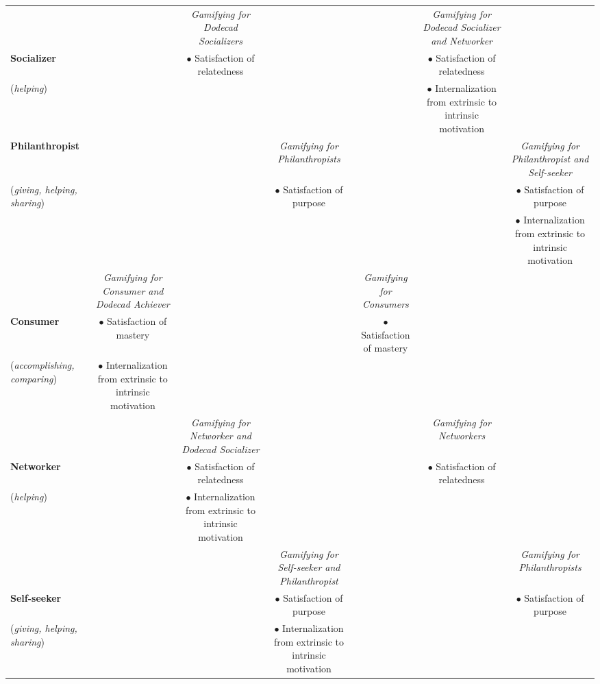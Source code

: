\begin{landscape}
\begin{quadro}[htb]
\begin{tabular}{|l|c|c|c|c|c|c|}
& &
\multicolumn{1}{p{3cm}|}{\tiny\emph{Gamifying for Dodecad Socializers}}& & &
\multicolumn{1}{p{3cm}|}{\tiny\emph{Gamifying for Dodecad Socializer and Networker}}& \tabularnewline
{\textbf{Socializer}}& &
\multicolumn{1}{p{3cm}|}{\tiny{$\bullet$ Satisfaction of relatedness}}& & &
\multicolumn{1}{p{3cm}|}{\tiny{$\bullet$ Satisfaction of relatedness}}& \tabularnewline
{\tiny(\emph{helping})}& & 
\multicolumn{1}{p{3cm}|}{}& & &
\multicolumn{1}{p{3cm}|}{\tiny{$\bullet$ Internalization from extrinsic to intrinsic motivation}}& \tabularnewline
\hline

\textbf{Philanthropist}& & &
\multicolumn{1}{p{3cm}|}{\tiny\emph{Gamifying for Philanthropists}}& & &
\multicolumn{1}{p{3cm}|}{\tiny\emph{Gamifying for Philanthropist and Self-seeker}}\tabularnewline
{\tiny(\emph{giving, helping, sharing})}& & &
\multicolumn{1}{p{3cm}|}{\tiny{$\bullet$ Satisfaction of purpose}}& & &
\multicolumn{1}{p{3cm}|}{\tiny{$\bullet$ Satisfaction of purpose}}\tabularnewline
& & &
\multicolumn{1}{p{3cm}|}{}& & &
\multicolumn{1}{p{3cm}|}{\tiny{$\bullet$ Internalization from extrinsic to intrinsic motivation}}\tabularnewline
\hline

&
\multicolumn{1}{p{3cm}|}{\tiny\emph{Gamifying for Consumer and Dodecad Achiever}}& & &
\multicolumn{1}{p{3cm}|}{\tiny\emph{Gamifying for Consumers}}& &  \tabularnewline
{\textbf{Consumer}}&
\multicolumn{1}{p{3cm}|}{\tiny{$\bullet$ Satisfaction of mastery}}& & &
\multicolumn{1}{p{3cm}|}{\tiny{$\bullet$ Satisfaction of mastery}}& & \tabularnewline
{\tiny(\emph{accomplishing, comparing})}&
\multicolumn{1}{p{3cm}|}{\tiny{$\bullet$ Internalization from extrinsic to intrinsic motivation}}& & &
\multicolumn{1}{p{3cm}|}{}& & \tabularnewline%
\hline

& &
\multicolumn{1}{p{3cm}|}{\tiny\emph{Gamifying for Networker and Dodecad Socializer}}& & &
\multicolumn{1}{p{3cm}|}{\tiny\emph{Gamifying for Networkers}}&  \tabularnewline
{\textbf{Networker}}& &
\multicolumn{1}{p{3cm}|}{\tiny{$\bullet$ Satisfaction of relatedness}}& & &
\multicolumn{1}{p{3cm}|}{\tiny{$\bullet$ Satisfaction of relatedness}}& \tabularnewline
{\tiny(\emph{helping})}& & 
\multicolumn{1}{p{3cm}|}{\tiny{$\bullet$ Internalization from extrinsic to intrinsic motivation}}& & &
\multicolumn{1}{p{3cm}|}{}& \tabularnewline
\hline

& & &
\multicolumn{1}{p{3cm}|}{\tiny\emph{Gamifying for Self-seeker and Philanthropist}}& & &
\multicolumn{1}{p{3cm}|}{\tiny\emph{Gamifying for Philanthropists}}\tabularnewline
{\textbf{Self-seeker}}& & &
\multicolumn{1}{p{3cm}|}{\tiny{$\bullet$ Satisfaction of purpose}}& & &
\multicolumn{1}{p{3cm}|}{\tiny{$\bullet$ Satisfaction of purpose}}\tabularnewline
{\tiny(\emph{giving, helping, sharing})}& & &
\multicolumn{1}{p{3cm}|}{\tiny{$\bullet$ Internalization from extrinsic to intrinsic motivation}}& & &
\multicolumn{1}{p{3cm}|}{}\tabularnewline
\hline
\end{tabular}
 \fautor
\end{quadro}
\end{landscape}

